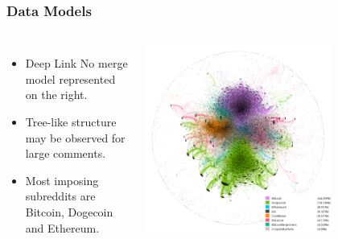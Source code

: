 \documentclass[aspectratio=169]{beamer}
\begin{document}
\begin{frame}[t]
    \frametitle{Data Models}
    \vspace{1.0cm}
    \begin{columns}
        \begin{itemize}
            \item Deep Link No merge model represented on the right.
            \item Tree-like structure may be observed for large comments.
            \item Most imposing subreddits are Bitcoin, Dogecoin and Ethereum.
        \end{itemize}
        \includegraphics[width=0.7\textwidth]{figures/subreddits_labelled.png}
    \end{columns}
\end{frame}
\end{document}
